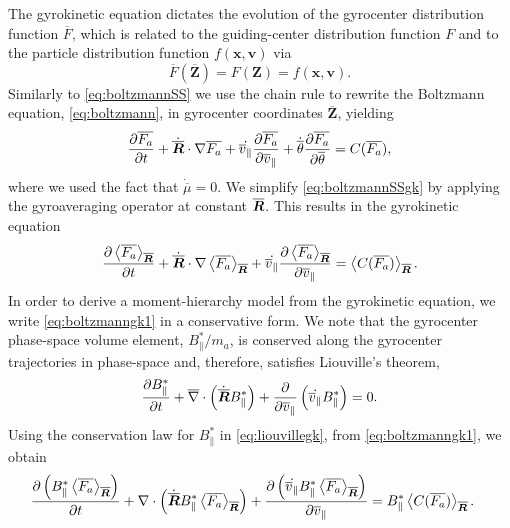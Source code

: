 The gyrokinetic equation dictates the evolution of the gyrocenter distribution function $\overline F$, which is related to the guiding-center distribution function $F$ and to the particle distribution function $f(\mathbf x, \mathbf{v})$ via
%
\begin{equation}
    \overline F(\overline{\mathbf Z}) = F(\mathbf Z)=f(\mathbf x, \mathbf v).
\end{equation}
%
Similarly to \cref{eq:boltzmannSS} we use the chain rule to rewrite the Boltzmann equation, \cref{eq:boltzmann}, in gyrocenter coordinates $\overline{\mathbf Z}$, yielding
%
\begin{equation}
     \frac{\partial \overline{F_a}}{\partial t}+\dot{\overline{\bm{R}}}\cdot \nabla \overline{F_a} + \dot{\overline v_\parallel}\frac{\partial \overline{F_a}}{\partial \overline v_\parallel} + \dot {\overline \theta} \frac{\partial \overline{F_a}}{\partial \overline \theta} = C(\overline{F_a}),
     \label{eq:boltzmannSSgk}
\end{equation}
%
where we used the fact that $\dot{\overline \mu}=0$.
%
We simplify \cref{eq:boltzmannSSgk} by applying the gyroaveraging operator at constant $\overline{\bm{R}}$.
%
This results in the gyrokinetic equation
%
\begin{equation}
    \frac{\partial \left< \overline{F_a} \right>_{\overline{\bm{R}}}}{\partial t}+ \dot{\overline{\bm{R}}} \cdot \nabla\left< \overline{F_a} \right>_{\overline{\bm{R}}} + \dot {\overline v_{\parallel}}\frac{\partial \left< \overline{F_a} \right>_{\overline{\bm{R}}}}{\partial \overline v_\parallel} = \left< C(\overline{F_a})\right>_{\overline{\bm{R}}}.
    \label{eq:boltzmanngk1}
\end{equation}
%
In order to derive a moment-hierarchy model from the gyrokinetic equation, we write \cref{eq:boltzmanngk1} in a conservative form.
%
We note that the gyrocenter phase-space volume element, $B_\parallel^* / m_a$, is conserved along the gyrocenter trajectories in phase-space \citep{Brizard2007a} and, therefore, satisfies Liouville's theorem,
 \begin{equation}
 \frac{\partial B_\parallel^*}{\partial t} + \overline{\nabla} \cdot \left( \dot{\overline{\bm{R}}} B_\parallel^*     \right) + \frac{\partial }{\partial \overline{v}_{\parallel}} \left(  \dot{\overline{v}_{\parallel}} B_\parallel^* \right) =0. 
 \label{eq:liouvillegk}
 \end{equation}
%
Using the conservation law for $B_\parallel^*$ in \cref{eq:liouvillegk}, from \cref{eq:boltzmanngk1}, we obtain
%
\begin{equation}
    \begin{split}
        &\frac{\partial \left(B_{\parallel}^*\left< \overline{F_a} \right>_{\overline{\bm{R}}}\right)}{\partial t}+ \nabla \cdot \left( \dot{\overline{\bm{R}}} B_{\parallel}^*\left< \overline{F_a} \right>_{\overline{\bm{R}}}\right) + \frac{\partial\left( \dot {\overline v_{\parallel}} B_{\parallel}^*\left< \overline{F_a} \right>_{\overline{\bm{R}}}\right)}{\partial \overline v_\parallel} = B_{\parallel}^*\left< C(\overline{F_a})\right>_{\overline{\bm{R}}}. 
    \end{split}
    \label{eq:boltzmanngk}
\end{equation}

